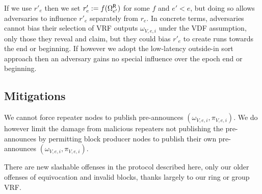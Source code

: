 If we use $r'_e$ then we set $r'_e := f(\Omega^{\mathsf{R}}_{e'})$ for some $f$ and $e' < e$, but doing so allows adversaries to influence $r'_e$ separately from $r_e$.  In concrete terms, adversaries cannot bias their selection of VRF outputs $\omega_{V,e,i}$ under the VDF assumption, only those they reveal and claim, but they could bias $r'_e$ to create runs towards the end or beginning.  If however we adopt the low-latency outside-in sort approach then an adversary gains no special influence over the epoch end or beginning. 


\subsection{Mitigations}\label{subsec:slashing}

We cannot force repeater nodes to publish pre-announces $(\omega_{V,e,i},\pi_{V,e,i})$.  We do however limit the damage from malicious repeaters not publishing the pre-announces by permitting block producer nodes to publish their own pre-announces $(\omega_{V,e,i},\pi_{V,e,i})$.  

There are new slashable offenses in the protocol described here, only our older offenses of equivocation and invalid blocks, thanks largely to our ring or group VRF.  






